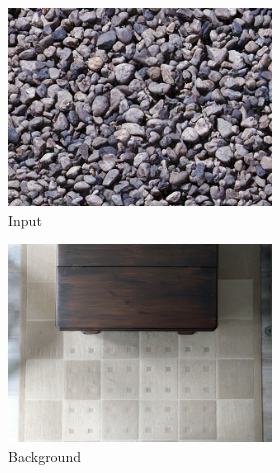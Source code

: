 \begin{figure}[]
\begin{subfigure}{\textwidth}
        \begin{subfigure}{0.24\textwidth}
            \centering
            \includegraphics[width=\textwidth]{images/04-experiment02/carpet/pebbles/target.jpg}
            \caption*{Input}
        \end{subfigure}
        \hfill
        \begin{subfigure}{0.24\textwidth}
            \centering
            \includegraphics[width=\textwidth]{images/04-experiment02/carpet/bg.jpg}
            \caption*{Background}
        \end{subfigure}
        \hfill
        \begin{subfigure}{0.24\textwidth}
            \centering

\end{subfigure}
\end{subfigure}
\end{figure}
